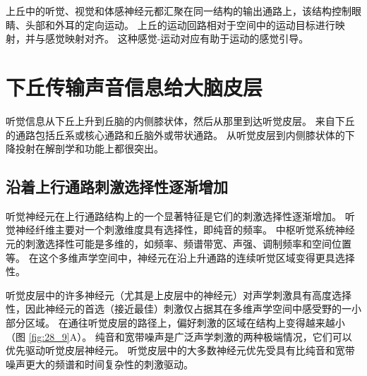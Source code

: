 上丘中的听觉、视觉和体感神经元都汇聚在同一结构的输出通路上，该结构控制眼睛、头部和外耳的定向运动。
上丘的运动回路相对于空间中的运动目标进行映射，并与感觉映射对齐。
这种感觉-运动对应有助于运动的感觉引导。



\section{下丘传输声音信息给大脑皮层}

听觉信息从下丘上升到丘脑的内侧膝状体，然后从那里到达听觉皮层。 
来自下丘的通路包括丘系或核心通路和丘脑外或带状通路。 
从听觉皮层到内侧膝状体的下降投射在解剖学和功能上都很突出。


\subsection{沿着上行通路刺激选择性逐渐增加}

听觉神经元在上行通路结构上的一个显著特征是它们的刺激选择性逐渐增加。
听觉神经纤维主要对一个刺激维度具有选择性，即纯音的频率。 
中枢听觉系统神经元的刺激选择性可能是多维的，如频率、频谱带宽、声强、调制频率和空间位置等。 
在这个多维声学空间中，神经元在沿上升通路的连续听觉区域变得更具选择性。


听觉皮层中的许多神经元（尤其是上皮层中的神经元）对声学刺激具有高度选择性，因此神经元的首选（接近最佳）刺激仅占据其在多维声学空间中感受野的一小部分区域。 
在通往听觉皮层的路径上，偏好刺激的区域在结构上变得越来越小（图 \ref{fig:28_9}A）。 
纯音和宽带噪声是广泛声学刺激的两种极端情况，它们可以优先驱动听觉皮层神经元。 
听觉皮层中的大多数神经元优先受具有比纯音和宽带噪声更大的频谱和时间复杂性的刺激驱动。


